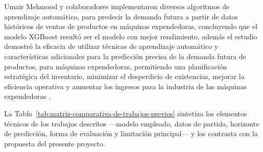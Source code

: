Umair Mehmood y colaboradores implementaron diversos algoritmos de aprendizaje automático, para predecir la demanda futura a partir de datos históricos de ventas de productos en máquinas expendedoras, concluyendo que el modelo XGBoost resultó ser el modelo con mejor rendimiento, además el estudio demostró la eficacia de utilizar técnicas de aprendizaje automático y características adicionales para la predicción precisa de la demanda futura de productos, para máquinas expendedoras, permitiendo una planificación estratégica del inventario, minimizar el desperdicio de existencias, mejorar la eficiencia operativa y aumentar los ingresos para la industria de las máquinas expendedoras \citep{mehmood2023}.

La Tabla~\ref{tab:matriz-comparativa-de-trabajos-previos} sintetiza los elementos técnicos de los trabajos descritos —modelo empleado, datos de partida, horizonte de predicción, forma de evaluación y limitación principal— y los contrasta con la propuesta del presente proyecto.

\label{tab:matriz-comparativa-de-trabajos-previos}

